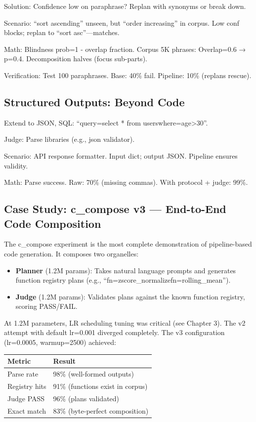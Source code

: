 \documentclass[
]{article}
\providecommand{\tightlist}{%
  \setlength{\itemsep}{0pt}\setlength{\parskip}{0pt}}
\begin{document}
Solution: Confidence low on paraphrase? Replan with synonyms or break
down.

Scenario: ``sort ascending'' unseen, but ``order increasing'' in corpus.
Low conf blocks; replan to ``sort asc''---matches.

Math: Blindness prob=1 - overlap fraction. Corpus 5K phrases:
Overlap=0.6 → p=0.4. Decomposition halves (focus sub-parts).

Verification: Test 100 paraphrases. Base: 40\% fail. Pipeline: 10\%
(replans rescue).

\subsection{Structured Outputs: Beyond
Code}\label{structured-outputs-beyond-code}

Extend to JSON, SQL: ``query=select * from
users\textbar where=age\textgreater30''.

Judge: Parse libraries (e.g., json validator).

Scenario: API response formatter. Input dict; output JSON. Pipeline
ensures validity.

Math: Parse success. Raw: 70\% (missing commas). With protocol + judge:
99\%.

\subsection{Case Study: c\_compose v3 --- End-to-End Code
Composition}\label{case-study-c99_compose-v3-end-to-end-code-composition}

The c\_compose experiment is the most complete demonstration of
pipeline-based code generation. It composes two organelles:

\begin{itemize}
\tightlist
\item
  \textbf{Planner} (1.2M params): Takes natural language prompts and
  generates function registry plans (e.g.,
  ``fn=zscore\_normalize\textbar fn=rolling\_mean'').
\item
  \textbf{Judge} (1.2M params): Validates plans against the known
  function registry, scoring PASS/FAIL.
\end{itemize}

At 1.2M parameters, LR scheduling tuning was critical (see Chapter 3).
The v2 attempt with default lr=0.001 diverged completely. The v3
configuration (lr=0.0005, warmup=2500) achieved:

\begin{longtable}[]{@{}ll@{}}
\toprule\noalign{}
Metric & Result \\
\midrule\noalign{}
\endhead
\bottomrule\noalign{}
\endlastfoot
Parse rate & 98\% (well-formed outputs) \\
Registry hits & 91\% (functions exist in corpus) \\
Judge PASS & 96\% (plans validated) \\
Exact match & 83\% (byte-perfect composition) \\
\end{longtable}
\end{document}
